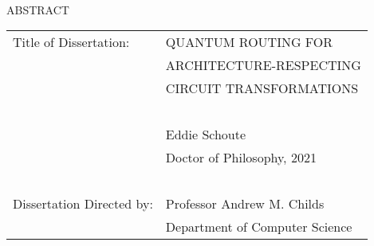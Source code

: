 \hbox{\ }

\begin{center}
\large{{ABSTRACT}}

\vspace{3em}

\end{center}
\hspace{-.15in}
\begin{tabular}{ll}
Title of Dissertation:     & {\large  QUANTUM ROUTING FOR}\\
                           & {\large  ARCHITECTURE-RESPECTING } \\
                           & {\large  CIRCUIT TRANSFORMATIONS } \\
\                         \\
                           & {\large  Eddie Schoute } \\
                           & {\large Doctor of Philosophy, 2021} \\
\                         \\
Dissertation Directed by:  & {\large  Professor Andrew M. Childs} \\
                           & {\large  Department of Computer Science } \\
\end{tabular}

\vspace{3em}

\begin{doublespacing}
\par
\end{doublespacing}
